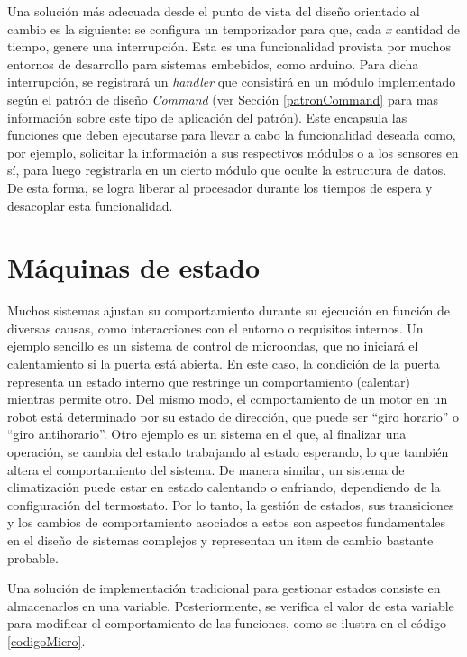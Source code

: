 Una solución más adecuada desde el punto de vista del diseño orientado al cambio es la siguiente: se configura un temporizador para que, cada \textit{x} cantidad de tiempo, genere una interrupción. Esta es una funcionalidad provista por muchos entornos de desarrollo para sistemas embebidos, como \gls{arduino}.
Para dicha interrupción, se registrará un \textit{handler} que consistirá en un módulo implementado según el patrón de diseño \textit{Command} (ver Sección \ref{patronCommand} para mas información sobre este tipo de aplicación del patrón). Este encapsula las funciones que deben ejecutarse para llevar a cabo la funcionalidad deseada como, por ejemplo, solicitar la información a sus respectivos módulos \Computador o a los sensores en sí, para luego registrarla en un cierto módulo que oculte la estructura de datos. De esta forma, se logra liberar al procesador durante los tiempos de espera y desacoplar esta funcionalidad.


\section{Máquinas de estado}\label{cap:state}

Muchos sistemas ajustan su comportamiento durante su ejecución en función de diversas causas, como interacciones con el entorno o requisitos internos. Un ejemplo sencillo es un sistema de control de microondas, que no iniciará el calentamiento si la puerta está abierta. En este caso, la condición de la puerta representa un estado interno que restringe un comportamiento (calentar) mientras permite otro. Del mismo modo, el comportamiento de un motor en un robot está determinado por su estado de dirección, que puede ser ``giro horario'' o ``giro antihorario''. Otro ejemplo es un sistema en el que, al finalizar una operación, se cambia del estado trabajando al estado esperando, lo que también altera el comportamiento del sistema. De manera similar, un sistema de climatización puede estar en estado calentando o enfriando, dependiendo de la configuración del termostato. Por lo tanto, la gestión de estados, sus transiciones y los cambios de comportamiento asociados a estos son aspectos fundamentales en el diseño de sistemas complejos y representan un item de cambio bastante probable.

Una solución de implementación tradicional para gestionar estados consiste en almacenarlos en una variable. Posteriormente, se verifica el valor de esta variable para modificar el comportamiento de las funciones, como se ilustra en el código \ref{codigoMicro}.

